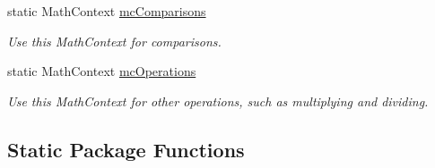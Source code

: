 \begin{DoxyCompactItemize}
static Math\+Context \hyperlink{classcom_1_1aarrelaakso_1_1drawl_1_1_drawl_number_a520b230ee4ceb0e1bef368ace676a954}{mc\+Comparisons}
\begin{DoxyCompactList}\small\item\em Use this Math\+Context for comparisons. \end{DoxyCompactList}\item 
static Math\+Context \hyperlink{classcom_1_1aarrelaakso_1_1drawl_1_1_drawl_number_a75a2442ef7cdcfb4dca9aba870ee7108}{mc\+Operations}
\begin{DoxyCompactList}\small\item\em Use this Math\+Context for other operations, such as multiplying and dividing. \end{DoxyCompactList}\end{DoxyCompactItemize}
\subsection*{Static Package Functions}
